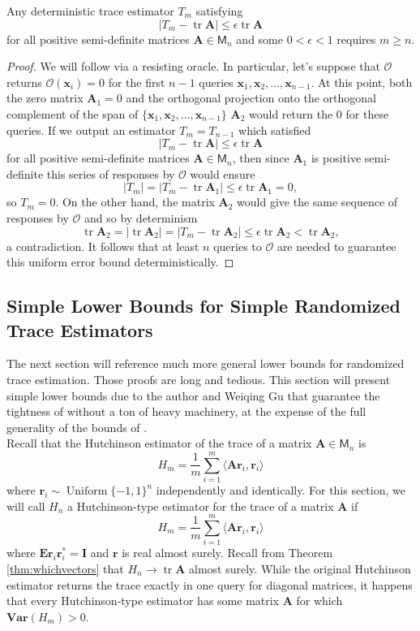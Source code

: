\documentclass[10pt,letterpaper]{siamart171218}
\theoremstyle{definition}
\theoremstyle{remark}
\newcommand\inner[1]{\langle #1 \rangle}
\newcommand\M{\mathsf{M}}
\newcommand\E{\mathbf{E}}
\renewcommand\O{\mathcal{O}}
\newcommand\Var{\mathbf{Var}}
\newcommand\tr{\operatorname{tr}}
\newcommand\A{\boldsymbol{A}}
\newcommand\I{\boldsymbol{I}}
\newcommand\x{\boldsymbol{x}}
\renewcommand\r{\boldsymbol{r}}
\begin{document}
\begin{theorem}
    Any deterministic trace estimator $T_m$ satisfying
    \[
        |T_m - \tr\A| \leq \epsilon\tr\A
    \]
    for all positive semi-definite matrices $\A\in\M_n$ and some
    $0<\epsilon < 1$ requires $m\geq n$.
\end{theorem}
\begin{proof}
    We will follow via a resisting oracle. In particular, let's suppose that $\O$
    returns $\O(\x_i) = 0$ for the first $n-1$ queries $\x_1,\x_2,\ldots,\x_{n-1}$.
    At this point, both the zero matrix $\A_1 = 0$ and the orthogonal projection
    onto the orthogonal complement of the span of $\{\x_1,\x_2,\ldots,\x_{n-1}\}$
    $\A_2$ would return the $0$ for these queries. If we output an estimator
    $T_m = T_{n-1}$ which satisfied
    \[
        |T_m - \tr\A| \leq \epsilon\tr\A
    \]
    for all positive semi-definite matrices $\A\in\M_n$, then since $\A_1$ is positive
    semi-definite this series of responses by $\O$ would ensure
    \[
        |T_m| = |T_m - \tr\A_1| \leq \epsilon\tr\A_1 = 0,
    \]
    so $T_m = 0$. On the other hand, the matrix $\A_2$ would give the same sequence
    of responses by $\O$ and so by determinism
    \[
        \tr\A_2 = |\tr\A_2| = |T_m - \tr\A_2| \leq \epsilon\tr\A_2 < \tr\A_2,
    \]
    a contradiction. It follows that at least $n$ queries to $\O$ are needed
    to guarantee this uniform error bound deterministically.
\end{proof}

\subsection{Simple Lower Bounds for Simple Randomized Trace Estimators}

The next section will reference much more general lower bounds for randomized
trace estimation. Those proofs are long and tedious. This section will present
simple lower bounds due to the author and Weiqing Gu that guarantee the
tightness of \cite{roosta2015improved} without a ton of heavy machinery, at the
expense of the full generality of the bounds of \cite{wimmer2014optimal}.\\

Recall that the Hutchinson estimator of the trace of a matrix $\A\in\M_n$ is 
\[
    H_m = \frac{1}{m}\sum_{i=1}^m \inner{\A\r_i,\r_i}
\]
where $\r_i\sim\operatorname{Uniform}\{-1,1\}^n$ independently and identically.
For this section, we will call $H_n$ a Hutchinson-type estimator for the trace of
a matrix $\A$ if
\[
    H_m = \frac{1}{m}\sum_{i=1}^m \inner{\A\r_i,\r_i}
\]
where $\E\r_i\r_i^* = \I$ and $\r$ is real almost surely.
Recall from Theorem \ref{thm:whichvectors} that $H_n\to\tr\A$
almost surely. While the original Hutchinson estimator returns the trace exactly in
one query for diagonal matrices, it happens that every Hutchinson-type estimator has
some matrix $\A$ for which $\Var(H_m) > 0$.
\end{document}
